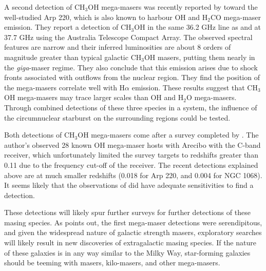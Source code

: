 A second detection of CH$_3$OH mega-masers was recently reported by \citet{chen_methanol_2015} toward the well-studied Arp 220, which is also known to harbour OH and H$_2$CO mega-maser emission. They report a detection of CH$_3$OH in the same 36.2 GHz line as \citet{wang2014_SiO_CH3OH} and at 37.7 GHz using the Australia Telescope Compact Array. The observed spectral features are narrow and their inferred luminosities are about 8 orders of magnitude greater than typical galactic CH$_3$OH masers, putting them nearly in the {\it giga}-maser regime. They also conclude that this emission arises due to shock fronts associated with outflows from the nuclear region. They find the position of the mega-masers correlate well with H$\alpha$ emission. These results suggest that CH$_3$OH mega-masers may trace larger scales than OH and H$_2$O mega-masers. Through combined detections of these three species in a system, the influence of the circumnuclear starburst on the surrounding regions could be tested.

Both detections of CH$_3$OH mega-masers come after a survey completed by \citet{darling2003_CH3OH}. The author's observed 28 known OH mega-maser hosts with Arecibo with the C-band receiver, which unfortunately limited the survey targets to redshifts greater than 0.11 due to the frequency cut-off of the receiver. The recent detections explained above are at much smaller redshifts (0.018 for Arp 220, and 0.004 for NGC 1068). It seems likely that the observations of \citet{darling2003_CH3OH} did have adequate sensitivities to find a detection.

These detections will likely spur further surveys for further detections of these masing species. As \citet{darling2012} points out, the first mega-maser detections were serendipitous, and given the widespread nature of galactic strength masers, exploratory searches will likely result in new discoveries of extragalactic masing species. If the nature of these galaxies is in any way similar to the Milky Way, star-forming galaxies should be teeming with masers, kilo-masers, and other mega-masers. 